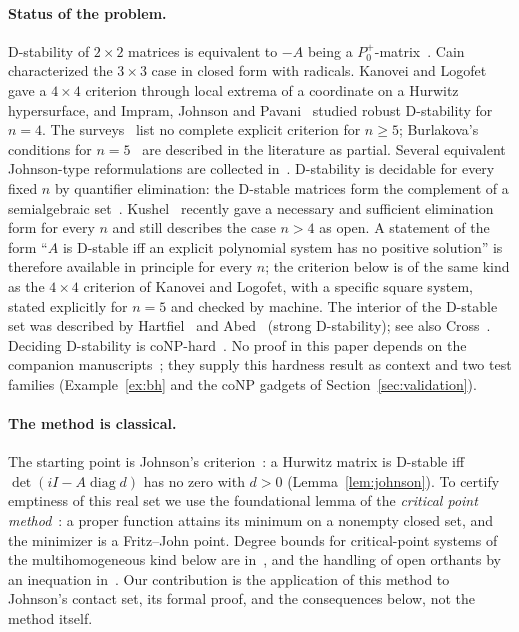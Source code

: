 \documentclass[11pt,a4paper]{article}
\theoremstyle{plain}
\theoremstyle{definition}
\newcommand{\diag}{\operatorname{diag}}
\begin{document}
\paragraph{Status of the problem.} D-stability of $2\times2$ matrices is equivalent to $-A$ being a
$P_0^+$-matrix~\cite{JohnsonCR1974JRNBS}. Cain~\cite{Cain1976} characterized the $3\times3$ case in closed form
with radicals. Kanovei and Logofet~\cite{KanoveiLogofet1998} gave a $4\times4$ criterion through local extrema of a
coordinate on a Hurwitz hypersurface, and Impram, Johnson and Pavani~\cite{ImpramJohnsonPavani2005} studied
robust D-stability for $n=4$. The surveys~\cite{Kushel2019,GiorgiZuccotti2015} list no complete explicit criterion for $n\ge5$;
Burlakova's conditions for $n=5$~\cite{Burlakova2009} are described in the literature as partial. Several equivalent
Johnson-type reformulations are collected in~\cite{KushelPavani2022}. D-stability is decidable for every fixed $n$
by quantifier elimination: the D-stable matrices form the complement of a semialgebraic
set~\cite{JohnsonTesi1999}. Kushel~\cite{Kushel2026} recently gave a necessary and sufficient elimination form for
every $n$ and still describes the case $n>4$ as open. A statement of the form ``$A$ is D-stable iff an explicit
polynomial system has no positive solution'' is therefore available in principle for every $n$; the criterion below
is of the same kind as the $4\times4$ criterion of Kanovei and Logofet, with a specific square system, stated
explicitly for $n=5$ and checked by machine. The interior of the D-stable set was described by Hartfiel~\cite{Hartfiel1980} and
Abed~\cite{Abed1986} (strong D-stability); see also Cross~\cite{Cross1978}. Deciding D-stability is
coNP-hard~\cite{companion_conp}. No proof in this paper depends on the companion
manuscripts~\cite{companion_attach,companion_conp}; they supply this hardness result as context and two test
families (Example~\ref{ex:bh} and the coNP gadgets of Section~\ref{sec:validation}).

\paragraph{The method is classical.} The starting point is Johnson's criterion~\cite{JohnsonCR1975JME}: a Hurwitz
matrix is D-stable iff $\det(iI-A\diag d)$ has no zero with $d>0$ (Lemma~\ref{lem:johnson}). To certify emptiness
of this real set we use the foundational lemma of the \emph{critical point method}~\cite{GrigorievVorobjov1988,Renegar1992a,Renegar1992b,Renegar1992c,BasuPollackRoy2006,AubryRouillierSafeyElDin2002,SafeyElDinSchost2003}:
a proper function attains its minimum on a nonempty closed set, and the minimizer is a Fritz--John point.
Degree bounds for critical-point systems of the multihomogeneous kind below are in~\cite{SafeyElDinSpaenlehauer2016},
and the handling of open orthants by an inequation in~\cite{BerthomieuGillotSafeyElDin2026}. Our contribution is
the application of this method to Johnson's contact set, its formal proof, and the consequences below, not the
method itself.
\end{document}
